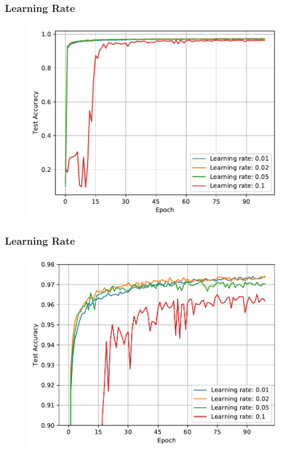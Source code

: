 \documentclass[pdf]{beamer}
\begin{document}
\begin{frame}
\frametitle{Learning Rate}
\begin{figure}[!htb]
  \includegraphics[height=0.8\textheight]{plots/learning_rate.pdf}
\end{figure}
\end{frame}

\begin{frame}
\frametitle{Learning Rate}
\begin{figure}[!htb]
  \includegraphics[height=0.8\textheight]{plots/learning_rate_zoom_2.pdf}
\end{figure}
\end{frame}
\end{document}

